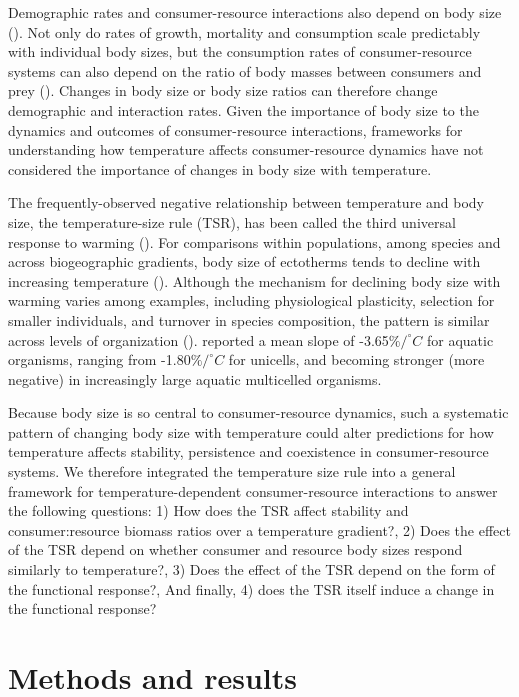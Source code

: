 \documentclass[11pt]{article}
\begin{document}
Demographic rates and consumer-resource interactions also depend on body size (\cite{Yodzis1992,DeLong2015}). 
Not only do rates of growth, mortality and consumption scale predictably with individual body sizes, but the consumption rates of consumer-resource systems can also depend on the ratio of body masses between consumers and prey (\cite{Kalinkat2013}). 
Changes in body size or body size ratios can therefore change demographic and interaction rates. Given the importance of body size to the dynamics and outcomes of consumer-resource interactions, frameworks for understanding how temperature affects consumer-resource dynamics have not considered the importance of changes in body size with temperature.

The frequently-observed negative relationship between temperature and body size, the temperature-size rule (TSR), has been called the third universal response to warming (\cite{Gardner2011}). 
For comparisons within populations, among species and across biogeographic gradients, body size of ectotherms tends to decline with increasing temperature (\cite{Atkinson1994,Daufresne2009,Forster2012,DeLong2012}). 
Although the mechanism for declining body size with warming varies among examples, including physiological plasticity, selection for smaller individuals, and turnover in species composition, the pattern is similar across levels of organization (\cite{Forster2012}). 
\cite{Forster2012} reported a mean slope of -3.65$\%/ ^\circ C$ for aquatic organisms, ranging from -1.80$\% / ^\circ C$ for unicells, and becoming stronger (more negative) in increasingly large aquatic multicelled organisms.

Because body size is so central to consumer-resource dynamics, such a systematic pattern of changing body size with temperature could alter predictions for how temperature affects stability, persistence and coexistence in consumer-resource systems. 
We therefore integrated the temperature size rule into a general framework for temperature-dependent consumer-resource interactions to answer the following questions: 
1) How does the TSR affect stability and consumer:resource biomass ratios over a temperature gradient?, 
2) Does the effect of the TSR depend on whether consumer and resource body sizes respond similarly to temperature?, 
3) Does the effect of the TSR depend on the form of the functional response?, 
And finally, 4) does the TSR itself induce a change in the functional response?

\section*{Methods and results}
\end{document}
